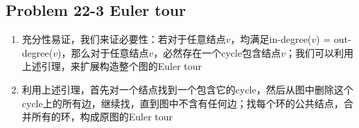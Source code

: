\subsection*{Problem 22-3 Euler tour}
\begin{enumerate}
	\item	充分性易证，我们来证必要性：若对于任意结点$v$，均满足in-degree($v$) = out-degree($v$)，那么对于任意结点$v$，必然存在一个cycle包含结点$v$；我们可以利用上述引理，来扩展构造整个图的Euler tour
	\item	利用上述引理，首先对一个结点找到一个包含它的cycle，然后从图中删除这个cycle上的所有边，继续找，直到图中不含有任何边；找每个环的公共结点，合并所有的环，构成原图的Euler tour
\end{enumerate}

